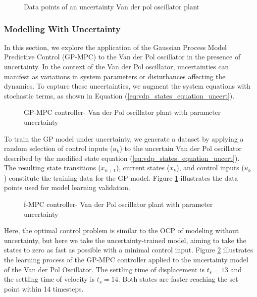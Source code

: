 \begin{figure}
    \centering
    
    \caption{Data points of an uncertainty Van der pol oscillator plant}
    \label{fig:data_points_with_unc_vdp}
\end{figure}

\subsubsection{Modelling With Uncertainty}
In this section, we explore the application of the Gaussian Process Model Predictive Control (GP-MPC) to the Van der Pol oscillator in the presence of uncertainty. In the context of the Van der Pol oscillator, uncertainties can manifest as variations in system parameters or disturbances affecting the dynamics. To capture these uncertainties, we augment the system equations with stochastic terms, as shown in Equation (\ref{eq:vdp_states_equation_uncert}). 


\begin{figure}
    \centering
    
    \caption{GP-MPC controller- Van der Pol oscillator plant with parameter uncertainty }
    \label{fig:Gp-mpc_unc_vdp}
\end{figure}



To train the GP model under uncertainty, we generate a dataset by applying a random selection of control inputs ($u_k$) to the uncertain Van der Pol oscillator described by the modified state equation (\ref{eq:vdp_states_equation_uncert}). The resulting state transitions ($x_{k+1}$), current states ($x_k$), and control inputs ($u_k$) constitute the training data for the GP model. Figure \ref{fig:data_points_with_unc_vdp} illustrates the data points used for model learning validation.

\begin{figure}
    \centering
    
    \caption{f-MPC controller- Van der Pol oscillator plant with parameter uncertainty}
    \label{fig:f-mpc_unc_vdp}
\end{figure}

Here, the optimal control problem is similar to the OCP of modeling without uncertainty, but here we take the uncertainty-trained model, aiming to take the states to zero as fast as possible with a minimal control input. Figure \ref{fig:Gp-mpc_unc_vdp} illustrates the learning process of the GP-MPC controller applied to the uncertainty model of the Van der Pol Oscillator. The settling time of displacement is $t_s=13$ and the settling time of velocity is $t_s=14$. Both states are faster reaching the set point within 14 timesteps. 

